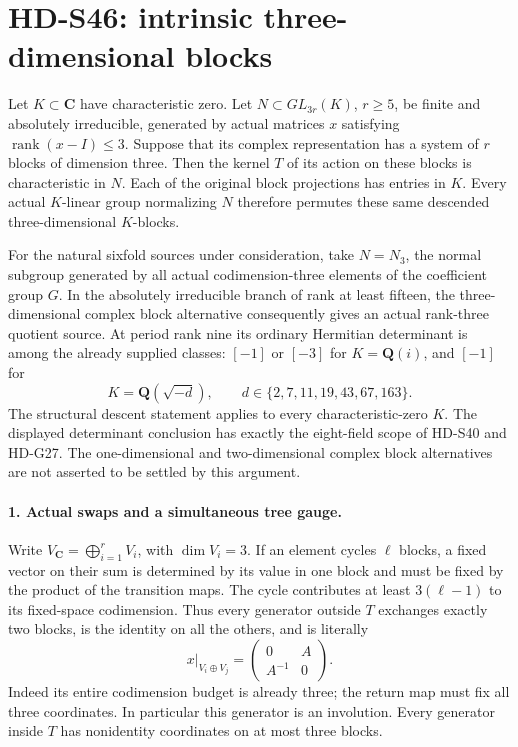 \section{HD-S46: intrinsic three-dimensional blocks}
\label{sec:three-block-kernel-scope}

Let \(K\subset\mathbf C\) have characteristic zero. Let
\(N\subset GL_{3r}(K)\), \(r\ge5\), be finite and absolutely
irreducible, generated by actual matrices \(x\) satisfying
\(\operatorname{rank}(x-I)\le3\). Suppose that its complex
representation has a system of \(r\) blocks of dimension three.
Then the kernel \(T\) of its action on these blocks is
characteristic in \(N\). Each of the original block projections
has entries in \(K\). Every actual \(K\)-linear group normalizing
\(N\) therefore permutes these same descended three-dimensional
\(K\)-blocks.

For the natural sixfold sources under consideration, take
\(N=N_3\), the normal subgroup generated by all actual
codimension-three elements of the coefficient group \(G\).
In the absolutely irreducible branch of rank at least fifteen,
the three-dimensional complex block alternative consequently
gives an actual rank-three quotient source. At period rank nine
its ordinary Hermitian determinant is among the already supplied
classes: \([-1]\) or \([-3]\) for \(K=\mathbf Q(i)\), and
\([-1]\) for
\[
 K=\mathbf Q(\sqrt{-d}),\qquad
 d\in\{2,7,11,19,43,67,163\}.
 \tag{S46.1}
\]
The structural descent statement applies to every characteristic-zero
\(K\). The displayed determinant conclusion has exactly the
eight-field scope of HD-S40 and HD-G27. The one-dimensional and
two-dimensional complex block alternatives are not asserted to
be settled by this argument.

\paragraph{1. Actual swaps and a simultaneous tree gauge.}
Write \(V_{\mathbf C}=\bigoplus_{i=1}^rV_i\), with
\(\dim V_i=3\). If an element cycles \(\ell\) blocks,
a fixed vector on their sum is determined by its value in one
block and must be fixed by the product of the transition maps.
The cycle contributes at least \(3(\ell-1)\) to its fixed-space
codimension. Thus every generator outside \(T\) exchanges
exactly two blocks, is the identity on all the others, and is
literally
\[
 x|_{V_i\oplus V_j}=
   \begin{pmatrix}0&A\\ A^{-1}&0\end{pmatrix}.
 \tag{S46.2}
\]
Indeed its entire codimension budget is already three; the
return map must fix all three coordinates. In particular this
generator is an involution. Every generator inside \(T\)
has nonidentity coordinates on at most three blocks.

